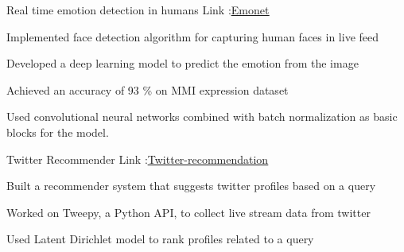 \begin{cventries}
  \cventry
    {}
    {Real time emotion detection in humans}
    {Link :\hspace{1mm}\href{https://github.com/gowtham06/Emonet}{\underline{Emonet}}}
    {}
    { 
      \begin{cvitems}
        {
        \item{Implemented face detection algorithm for capturing human faces in live feed}
        \item{Developed a deep learning model to predict the emotion from the image}
        \item{Achieved an accuracy of 93 \% on MMI expression dataset}
        \item{Used convolutional neural networks combined with batch normalization as basic blocks for the model.}
      }\end{cvitems}
    }
    \cventry
    {}
    {Twitter Recommender }
    {Link :\hspace{1mm}\href{https://github.com/gowtham06/twitter_recomendation.git}{\underline{Twitter-recommendation}}}
    {}
    {
    \begin{cvitems}
     {
    \item{Built a recommender system that suggests twitter profiles based on a query}
    \item{Worked on Tweepy, a Python API, to collect live stream data from twitter}
    \item{Used Latent Dirichlet model to rank profiles related to a query}
    }\end{cvitems}
    }
\end{cventries}

